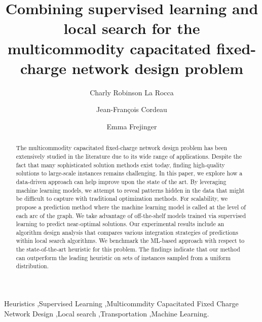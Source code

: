 \documentclass[3p, authoryear, times, doubleblind]{elsarticle}
\begin{document}
\begin{frontmatter}

\title{Combining supervised learning and local search for the multicommodity capacitated fixed-charge network design problem}

 
            \author[1]{Charly Robinson La Rocca}

            \author[2]{Jean-François Cordeau}

            \author[1]{Emma Frejinger}




        


\begin{abstract}
    The multicommodity capacitated fixed-charge network design problem has been extensively studied in the literature due to its wide range of applications. Despite the fact that many sophisticated solution methods exist today, finding high-quality solutions to large-scale instances remains challenging. In this paper, we explore how a data-driven approach can help improve upon the state of the art. By leveraging machine learning models, we attempt to reveal patterns hidden in the data that might be difficult to capture with traditional optimization methods. For scalability, we propose a prediction method where the machine learning model is called at the level of each arc of the graph. We take advantage of off-the-shelf models trained via supervised learning to predict near-optimal solutions. Our experimental results include an algorithm design analysis that compares various integration strategies of predictions within local search algorithms. We benchmark the ML-based approach with respect to the state-of-the-art heuristic for this problem. The findings indicate that our method can outperform the leading heuristic on sets of instances sampled from a uniform distribution. 
\end{abstract}
    
\begin{keyword}
    Heuristics \sep Supervised Learning \sep  Multicommdity Capacitated Fixed Charge Network Design  \sep  Local search \sep  Transportation \sep  Machine Learning.
\end{keyword}





\end{frontmatter}
\end{document}

